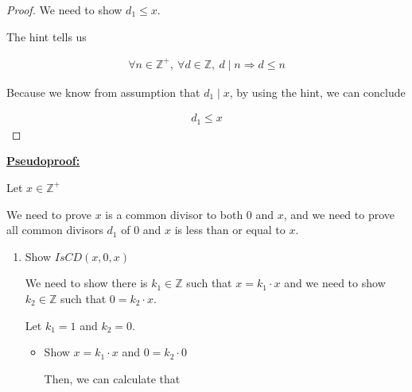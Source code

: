 \documentclass[12pt]{article}
\begin{document}
\begin{enumerate}[a.]
\begin{proof}
        \bigskip

        We need to show $d_1 \leq x$.

        \bigskip

        The hint tells us

        \begin{align}
            \forall n \in \mathbb{Z}^+,\:\forall d \in \mathbb{Z},\:d \mid n \Rightarrow d \leq n
        \end{align}

        \bigskip

        Because we know from assumption that $d_1 \mid x$, by using the hint,
        we can conclude

        \begin{align}
            d_1 \leq x
        \end{align}
    \end{proof}

    \bigskip

    \begin{mdframed}
        \underline{\textbf{Pseudoproof:}}

        \bigskip

        Let $x \in \mathbb{Z}^{+}$

        \bigskip

        We need to prove $x$ is a common divisor to both 0 and $x$, and we need
        to prove all common divisors $d_1$ of 0 and $x$ is less than or equal to $x$.

        \bigskip

        \begin{enumerate}[1.]
            \item Show $IsCD(x,0,x)$

            \bigskip

            We need to show there is $k_1 \in \mathbb{Z}$ such that
            $x = k_1 \cdot x$ and we need to show $k_2 \in \mathbb{Z}$ such that
            $0 = k_2 \cdot x$.

            \bigskip

            Let $k_1 = 1$ and $k_2 = 0$.

            \bigskip

            \begin{itemize}
                \item Show $x = k_1 \cdot x$ and $0 = k_2 \cdot 0$

                \begin{mdframed}
                Then, we can calculate that


\end{mdframed}
\end{itemize}
\end{enumerate}
\end{mdframed}
\end{enumerate}
\end{document}
